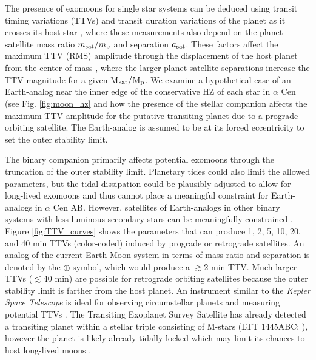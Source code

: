 \documentclass[preprint]{aastex63}
\begin{document}
The presence of exomoons for single star systems can be deduced using transit timing variations (TTVs) and transit duration variations of the planet as it crosses its host star \citep{Kipping2009a,Kipping2009b}, where these measurements also depend on the planet-satellite mass ratio $m_{\rm sat}/m_{\rm p}$ and separation $a_{\rm sat}$.  These factors affect the maximum TTV {(RMS)} amplitude through the displacement of the host planet from the center of mass \citep{Sartoretti1999}, where the larger planet-satellite separations increase the TTV magnitude for a given M$_{\rm sat}/$M$_{\rm p}$.  We examine a hypothetical case of an Earth-analog near the inner edge of the conservative HZ of each star in $\alpha$ Cen (see Fig. \ref{fig:moon_hz} and how the presence of the stellar companion affects the maximum TTV amplitude for the putative transiting planet due to a prograde orbiting satellite.  The Earth-analog is assumed to be at its forced eccentricity to set the outer stability limit.

The binary companion primarily affects potential exomoons through the truncation of the outer stability limit.  Planetary tides could also limit the allowed parameters, but the tidal dissipation could be plausibly adjusted to allow for long-lived exomoons and thus cannot place a meaningful constraint for Earth-analogs in $\alpha$ Cen AB.  However, satellites of Earth-analogs in other binary systems with less luminous secondary stars can be meaningfully constrained \citep{Sasaki2012,Quarles2020b}.  Figure \ref{fig:TTV_curves} shows the parameters that can produce 1, 2, 5, 10, 20, and 40 min TTVs (color-coded) induced by prograde or retrograde satellites.   An analog of the current Earth-Moon system in terms of mass ratio and separation is denoted by the $\oplus$ symbol, which would produce a $\gtrsim$2 min TTV.  Much larger TTVs ($\lesssim$40 min) are possible for retrograde orbiting satellites because the outer stability limit is farther from the host planet.  An instrument similar to the \textit{Kepler Space Telescope} is ideal for observing circumstellar planets and measuring potential TTVs \citep{Ford2011}.  The Transiting Exoplanet Survey Satellite \citep{Ricker2016} has already detected a transiting planet within a stellar triple consisting of M-stars (LTT 1445ABC; \cite{Winters2019}), however the planet is likely already tidally locked which may limit its chances to host long-lived moons \citep{Sasaki2012}.
\end{document}
